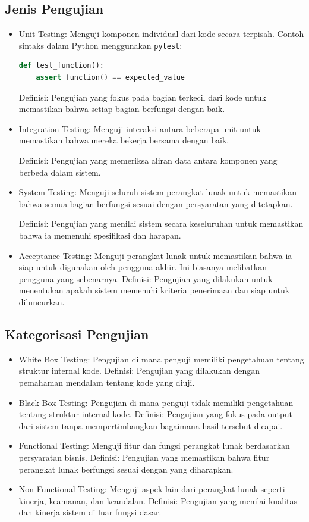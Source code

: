 \documentclass{article}
\begin{document}
\subsection{Jenis Pengujian}
\begin{itemize}
    \item Unit Testing: Menguji komponen individual dari kode secara terpisah. Contoh sintaks dalam Python menggunakan \verb|pytest|:
          \begin{lstlisting}[language=Python, caption={}, captionpos=b]
def test_function():
    assert function() == expected_value
\end{lstlisting}
          Definisi: Pengujian yang fokus pada bagian terkecil dari kode untuk memastikan bahwa setiap bagian berfungsi dengan baik.

    \item Integration Testing: Menguji interaksi antara beberapa unit untuk memastikan bahwa mereka bekerja bersama dengan baik.

          Definisi: Pengujian yang memeriksa aliran data antara komponen yang berbeda dalam sistem.
    \item System Testing: Menguji seluruh sistem perangkat lunak untuk memastikan bahwa semua bagian berfungsi sesuai dengan persyaratan yang ditetapkan.

          Definisi: Pengujian yang menilai sistem secara keseluruhan untuk memastikan bahwa ia memenuhi spesifikasi dan harapan.
    \item Acceptance Testing: Menguji perangkat lunak untuk memastikan bahwa ia siap untuk digunakan oleh pengguna akhir. Ini biasanya melibatkan pengguna yang sebenarnya. Definisi: Pengujian yang dilakukan untuk menentukan apakah sistem memenuhi kriteria penerimaan dan siap untuk diluncurkan.
\end{itemize}

\subsection{Kategorisasi Pengujian}
\begin{itemize}
    \item White Box Testing: Pengujian di mana penguji memiliki pengetahuan tentang struktur internal kode. Definisi: Pengujian yang dilakukan dengan pemahaman mendalam tentang kode yang diuji.
    \item Black Box Testing: Pengujian di mana penguji tidak memiliki pengetahuan tentang struktur internal kode. Definisi: Pengujian yang fokus pada output dari sistem tanpa mempertimbangkan bagaimana hasil tersebut dicapai.
    \item Functional Testing: Menguji fitur dan fungsi perangkat lunak berdasarkan persyaratan bisnis. Definisi: Pengujian yang memastikan bahwa fitur perangkat lunak berfungsi sesuai dengan yang diharapkan.
    \item Non-Functional Testing: Menguji aspek lain dari perangkat lunak seperti kinerja, keamanan, dan keandalan. Definisi: Pengujian yang menilai kualitas dan kinerja sistem di luar fungsi dasar.
\end{itemize}
\end{document}
